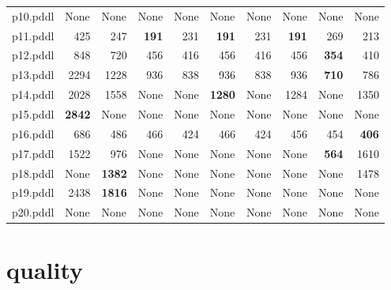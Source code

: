 \documentclass{article}
\begin{document}
\begin{tabular}{@{}lrrrrrrrrr@{}}
p10.pddl & \multicolumn{1}{|l|}{None} & \multicolumn{1}{|l|}{None} & \multicolumn{1}{|l|}{None} & \multicolumn{1}{|l|}{None} & \multicolumn{1}{|l|}{None} & \multicolumn{1}{|l|}{None} & \multicolumn{1}{|l|}{None} & \multicolumn{1}{|l|}{None} & \multicolumn{1}{|l|}{None} \\
p11.pddl & 425 & 247 & \textbf{191} & 231 & \textbf{191} & 231 & \textbf{191} & 269 & 213 \\
p12.pddl & 848 & 720 & 456 & 416 & 456 & 416 & 456 & \textbf{354} & 410 \\
p13.pddl & 2294 & 1228 & 936 & 838 & 936 & 838 & 936 & \textbf{710} & 786 \\
p14.pddl & 2028 & 1558 & \multicolumn{1}{|l|}{None} & \multicolumn{1}{|l|}{None} & \textbf{1280} & \multicolumn{1}{|l|}{None} & 1284 & \multicolumn{1}{|l|}{None} & 1350 \\
p15.pddl & \textbf{2842} & \multicolumn{1}{|l|}{None} & \multicolumn{1}{|l|}{None} & \multicolumn{1}{|l|}{None} & \multicolumn{1}{|l|}{None} & \multicolumn{1}{|l|}{None} & \multicolumn{1}{|l|}{None} & \multicolumn{1}{|l|}{None} & \multicolumn{1}{|l|}{None} \\
p16.pddl & 686 & 486 & 466 & 424 & 466 & 424 & 456 & 454 & \textbf{406} \\
p17.pddl & 1522 & 976 & \multicolumn{1}{|l|}{None} & \multicolumn{1}{|l|}{None} & \multicolumn{1}{|l|}{None} & \multicolumn{1}{|l|}{None} & \multicolumn{1}{|l|}{None} & \textbf{564} & 1610 \\
p18.pddl & \multicolumn{1}{|l|}{None} & \textbf{1382} & \multicolumn{1}{|l|}{None} & \multicolumn{1}{|l|}{None} & \multicolumn{1}{|l|}{None} & \multicolumn{1}{|l|}{None} & \multicolumn{1}{|l|}{None} & \multicolumn{1}{|l|}{None} & 1478 \\
p19.pddl & 2438 & \textbf{1816} & \multicolumn{1}{|l|}{None} & \multicolumn{1}{|l|}{None} & \multicolumn{1}{|l|}{None} & \multicolumn{1}{|l|}{None} & \multicolumn{1}{|l|}{None} & \multicolumn{1}{|l|}{None} & \multicolumn{1}{|l|}{None} \\
p20.pddl & \multicolumn{1}{|l|}{None} & \multicolumn{1}{|l|}{None} & \multicolumn{1}{|l|}{None} & \multicolumn{1}{|l|}{None} & \multicolumn{1}{|l|}{None} & \multicolumn{1}{|l|}{None} & \multicolumn{1}{|l|}{None} & \multicolumn{1}{|l|}{None} & \multicolumn{1}{|l|}{None} \\
\end{tabular}

\hypertarget{quality}{}
\section*{quality}
\end{document}
